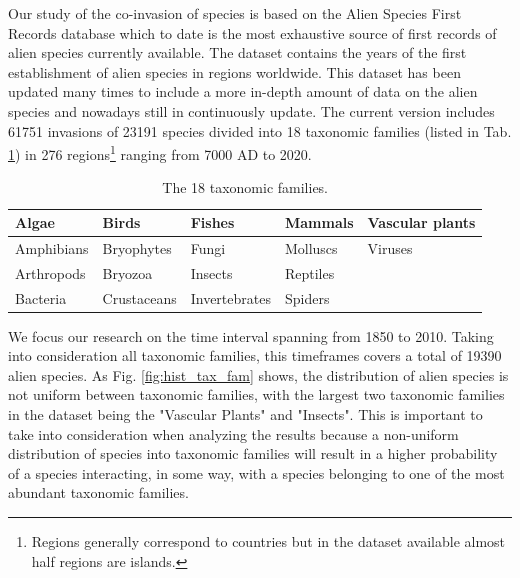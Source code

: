 \documentclass[mscthesis]{usiinfthesis}
\begin{document}
Our study of the co-invasion of species is based on the Alien Species First Records database \cite{intro:dataset} which to date is the most exhaustive source of first records of alien species currently available. The dataset contains the years of the first establishment of alien species in regions worldwide. This dataset has been updated many times to include a more in-depth amount of data on the alien species \cite{intro:datasetv2} and nowadays still in continuously update. The current version includes 61751 invasions of 23191 species divided into 18 taxonomic families (listed in Tab. \ref{table:families}) in 276 regions\footnote{Regions generally correspond to countries but in the dataset available almost half regions are islands.} ranging from 7000 AD to 2020.


\begin{table}[H]
\centering
\begin{tabular}{|l|l|l|l|l|}
\hline
Algae      & Birds       & Fishes        & Mammals  & Vascular plants \\ \hline
Amphibians & Bryophytes  & Fungi         & Molluscs & Viruses         \\ \hline
Arthropods & Bryozoa     & Insects       & Reptiles &                 \\ \hline
Bacteria   & Crustaceans & Invertebrates & Spiders  &                 \\ \hline             
\end{tabular}
\caption{The 18 taxonomic families.}
\label{table:families}
\end{table}

We focus our research on the time interval spanning from 1850 to 2010. Taking into consideration all taxonomic families, this timeframes covers a total of 19390 alien species. As Fig. \ref{fig:hist_tax_fam} shows, the distribution of alien species is not uniform between taxonomic families, with the largest two taxonomic families in the dataset being the "Vascular Plants" and "Insects". This is important to take into consideration when analyzing the results because a non-uniform distribution of species into taxonomic families will result in a higher probability of a species interacting, in some way, with a species belonging to one of the most abundant taxonomic families.
\end{document}
